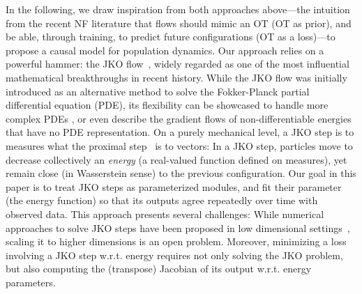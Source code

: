 In the following, we draw inspiration from both approaches above---the intuition from the recent \acrfull{NF} literature that flows should mimic an \acrlong{OT} (\acrshort{OT} as prior), and be able, through training, to predict future configurations (\acrshort{OT} as a loss)---to propose a causal model for population dynamics. Our approach relies on a powerful hammer: the \acrfull{JKO} flow~\citep{jordan1998variational}, widely regarded as one of the most influential mathematical breakthroughs in recent history. While the \acrshort{JKO} flow was initially introduced as an alternative method to solve the Fokker-Planck partial differential equation (PDE), its flexibility can be showcased to handle more complex PDEs \citep[\S4.7]{santambrogio2017euclidean}, or even describe the gradient flows of non-differentiable energies that have no PDE representation.
On a purely mechanical level, a \acrshort{JKO} step is to measures what the proximal step~\citep{combettes2011proximal} is to vectors: In a \acrshort{JKO} step, particles move to decrease collectively an {\em energy} (a real-valued function defined on measures), yet remain close (in Wasserstein sense) to the previous configuration. Our goal in this paper is to treat \acrshort{JKO} steps as parameterized modules, and fit their parameter (the energy function) so that its outputs agree repeatedly over time with observed data. 
This approach presents several challenges: While numerical approaches to solve \acrshort{JKO} steps have been proposed in low dimensional settings~\citep{burger2010a, carrillo2021primal, peyre2015entropic,benamou2016augmented}, scaling it to higher dimensions is an open problem. Moreover, minimizing a loss involving a \acrshort{JKO} step w.r.t. energy requires not only solving the \acrshort{JKO} problem, but also computing the (transpose) Jacobian of its output w.r.t. energy parameters.


